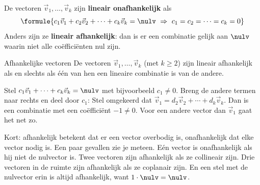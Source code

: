 \begin{theorie}
De vectoren $\vec v_1, \ldots, \vec v_k$ zijn \textbf{\textcolor{accent}{lineair onafhankelijk}} als
\[ \formule{c_1\vec v_1 + c_2\vec v_2 + \cdots + c_k\vec v_k = \nulv \ \Rightarrow \ c_1 = c_2 = \cdots = c_k = 0} \]
Anders zijn ze \textbf{\textcolor{accent}{lineair afhankelijk}}: dan is er een combinatie gelijk aan $\nulv$ waarin niet alle coëfficiënten nul zijn.

\begin{stelling}{Afhankelijke vectoren}
De vectoren $\vec v_1, \ldots, \vec v_k$ (met $k \geqslant 2$) zijn lineair afhankelijk als en slechts als één van hen een lineaire combinatie is van de andere.
\end{stelling}

\begin{bewijs}
Stel $c_1\vec v_1 + \cdots + c_k\vec v_k = \nulv$ met bijvoorbeeld $c_1 \neq 0$. Breng de andere termen naar rechts en deel door $c_1$:
Stel omgekeerd dat $\vec v_1 = d_2\vec v_2 + \cdots + d_k\vec v_k$. Dan is
een combinatie met een coëfficiënt $-1 \neq 0$. Voor een andere vector dan $\vec v_1$ gaat het net zo.
\end{bewijs}
\end{theorie}

Kort: afhankelijk betekent dat er een vector overbodig is, onafhankelijk dat elke vector nodig is. Een paar gevallen zie je meteen. Eén vector is onafhankelijk als hij niet de nulvector is. Twee vectoren zijn afhankelijk als ze collineair zijn. Drie vectoren in de ruimte zijn afhankelijk als ze coplanair zijn. En een stel met de nulvector erin is altijd afhankelijk, want $1 \cdot \nulv = \nulv$.


